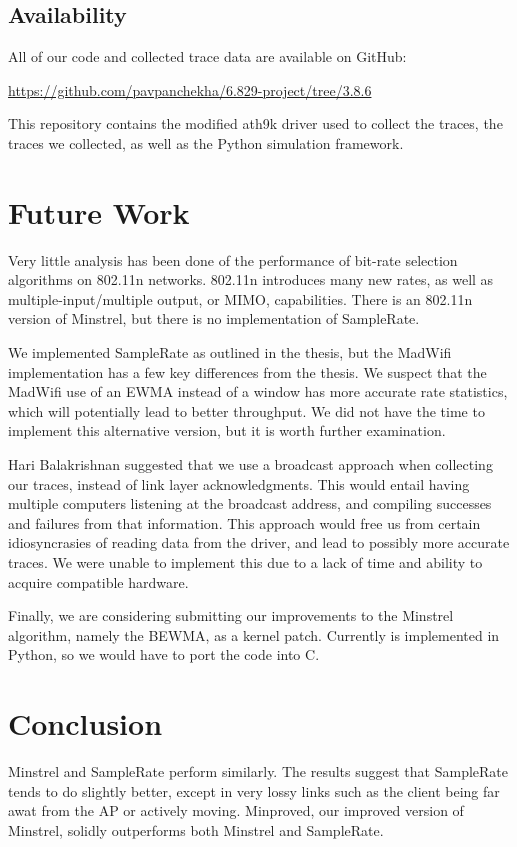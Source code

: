 \documentclass[letterpaper,twocolumn,10pt]{article}
\begin{document}
\subsection{Availability}
All of our code and collected trace data are available on GitHub:

\noindent
{\small\url{https://github.com/pavpanchekha/6.829-project/tree/3.8.6}}

This repository contains the modified ath9k driver used to collect the traces, the traces we collected, as well as the Python simulation framework. 

\section{Future Work}

Very little analysis has been done of the performance of bit-rate selection algorithms on 802.11n networks. 802.11n introduces many new rates, as well as multiple-input/multiple output, or MIMO, capabilities. There is an 802.11n version of Minstrel, but there is no implementation of SampleRate. 

We implemented SampleRate as outlined in the thesis, but the MadWifi implementation has a few key differences from the thesis. We suspect that the MadWifi use of an EWMA instead of a window has more accurate rate statistics, which will potentially lead to better throughput. We did not have the time to implement this alternative version, but it is worth further examination.

Hari Balakrishnan suggested that we use a broadcast approach when collecting our traces, instead of link layer acknowledgments. This would entail having multiple computers listening at the broadcast address, and compiling successes and failures from that information. This approach would free us from certain idiosyncrasies of reading data from the driver, and lead to possibly more accurate traces. We were unable to implement this due to a lack of time and ability to acquire compatible hardware.

Finally, we are considering submitting our improvements to the Minstrel algorithm, namely the BEWMA, as a kernel patch. Currently is implemented in Python, so we would have to port the code into C.

\section{Conclusion}

Minstrel and SampleRate perform similarly. The results suggest that SampleRate tends to do slightly better, except in very lossy links such as the client being far awat from the AP or actively moving. Minproved, our improved version of Minstrel, solidly outperforms both Minstrel and SampleRate. 
\end{document}
